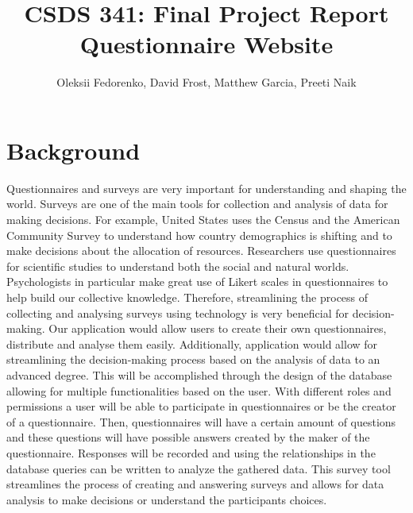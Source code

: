 \documentclass[12pt, oneside, a4paper]{article}
\title{CSDS 341: Final Project Report\\ Questionnaire Website}
\author{Oleksii Fedorenko, David Frost, Matthew Garcia, Preeti Naik}
\begin{document}
    \maketitle
    \section{Background}
    Questionnaires and surveys are very important for understanding and shaping the world. Surveys are one of the main tools for collection and analysis of data for making decisions. For example, United States uses the Census and the American Community Survey to understand how country demographics is shifting and to make decisions about the allocation of resources. Researchers use questionnaires for scientific studies to understand both the social and natural worlds. Psychologists in particular make great use of Likert scales in questionnaires to help build our collective knowledge. 
    \newline\newline\indent Therefore, streamlining the process of collecting and analysing surveys using technology is very beneficial for decision-making. Our application would allow users to create their own questionnaires, distribute and analyse them easily. Additionally, application would allow for streamlining the decision-making process based on the analysis of data to an advanced degree.
    \newline\newline\indent This will be accomplished through the design of the database allowing for multiple functionalities based on the user. With different roles and permissions a user will be able to participate in questionnaires or be the creator of a questionnaire. Then, questionnaires will have a certain amount of questions and these questions will have possible answers created by the maker of the questionnaire. Responses will be recorded and using the relationships in the database queries can be written to analyze the gathered data. This survey tool streamlines the process of creating and answering surveys and allows for data analysis to make decisions or understand the participants choices.
\end{document}
